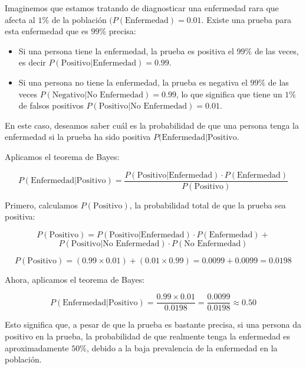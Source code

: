 \documentclass[
  letterpaper,
  DIV=11,
  numbers=noendperiod]{scrreprt}
\providecommand{\tightlist}{%
  \setlength{\itemsep}{0pt}\setlength{\parskip}{0pt}}\usepackage{longtable,booktabs,array}
\begin{document}
\begin{tcolorbox}[enhanced jigsaw, arc=.35mm, breakable, coltitle=black, left=2mm, opacityback=0, bottomtitle=1mm, colbacktitle=quarto-callout-tip-color!10!white, title=\textcolor{quarto-callout-tip-color}{\faLightbulb}\hspace{0.5em}{Ejemplo. Teorema de Bayes.}, titlerule=0mm, colback=white, colframe=quarto-callout-tip-color-frame, bottomrule=.15mm, rightrule=.15mm, opacitybacktitle=0.6, toptitle=1mm, toprule=.15mm, leftrule=.75mm]

Imaginemos que estamos tratando de diagnosticar una enfermedad rara que
afecta al \(1\%\) de la población \((P(\text{Enfermedad}) = 0.01\).
Existe una prueba para esta enfermedad que es \(99\%\) precisa:

\begin{itemize}
\tightlist
\item
  Si una persona tiene la enfermedad, la prueba es positiva el \(99\%\)
  de las veces, es decir
  \(P(\text{Positivo}|\text{Enfermedad}) = 0.99\).
\item
  Si una persona no tiene la enfermedad, la prueba es negativa el
  \(99\%\) de las veces
  \(P(\text{Negativo}|\text{No Enfermedad}) = 0.99\), lo que significa
  que tiene un \(1\%\) de falsos positivos
  \(P(\text{Positivo}|\text{No Enfermedad}) = 0.01\).
\end{itemize}

En este caso, deseamos saber cuál es la probabilidad de que una persona
tenga la enfermedad si la prueba ha sido positiva
\(P(\text{Enfermedad}|\text{Positivo}\).

Aplicamos el teorema de Bayes:

\[
P(\text{Enfermedad}|\text{Positivo}) = \frac{P(\text{Positivo}|\text{Enfermedad}) \cdot P(\text{Enfermedad})}{P(\text{Positivo})}
\]

Primero, calculamos \(P(\text{Positivo})\), la probabilidad total de que
la prueba sea positiva:

\[
P(\text{Positivo}) = P(\text{Positivo}|\text{Enfermedad}) \cdot P(\text{Enfermedad}) +
\]
\[P(\text{Positivo}|\text{No Enfermedad}) \cdot P(\text{No Enfermedad})
\]

\[
P(\text{Positivo}) = (0.99 \times 0.01) + (0.01 \times 0.99) = 0.0099 + 0.0099 = 0.0198
\]

Ahora, aplicamos el teorema de Bayes:

\[
P(\text{Enfermedad}|\text{Positivo}) = \frac{0.99 \times 0.01}{0.0198} = \frac{0.0099}{0.0198} \approx 0.50
\]

Esto significa que, a pesar de que la prueba es bastante precisa, si una
persona da positivo en la prueba, la probabilidad de que realmente tenga
la enfermedad es aproximadamente \(50\%\), debido a la baja prevalencia
de la enfermedad en la población.

\end{tcolorbox}
\end{document}
